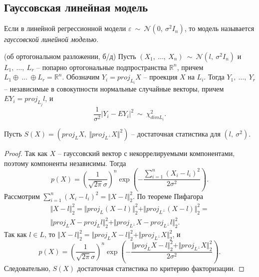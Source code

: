 \subsection{Гауссовская линейная модель}
\begin{definition}
    Если в линейной регрессионной модели $\displaystyle \varepsilon \ \sim \ \mathcal{N}\left( 0,\ \sigma ^{2} I_{n}\right)$, то модель называется \textit{гауссовской линейной моделью}.
\end{definition}
\begin{theorem}
    (об ортогональном разложении, б/д) Пусть $\displaystyle ( X_{1} ,\ \dotsc ,\ X_{n}) \ \sim \ \mathcal{N}\left( l,\ \sigma ^{2} I_{n}\right)$ и $\displaystyle L_{1} ,\ \dotsc ,\ L_{r}$ -- попарно ортогональные подпространства $\displaystyle \mathbb{R}^{n}$, причем $\displaystyle L_{1} \oplus \ \dotsc \ \oplus L_{r} =\mathbb{R}^{n}$. Обозначим $\displaystyle Y_{i} =proj_{L_{i}} X$ -- проекция $\displaystyle X$ на $\displaystyle L_{i}$. Тогда $\displaystyle Y_{1} ,\ \dotsc ,\ Y_{r}$ -- независимые в совокупности нормальные случайные векторы, причем $\displaystyle EY_{i} =proj_{L_{j}} l$, и
    \begin{equation*}
        \dfrac{1}{\sigma ^{2}}| Y_{i} -EY_{i}| ^{2} \ \sim \ \chi _{dimL_{i}}^{2} .
    \end{equation*}
\end{theorem}
\begin{proposition}
    Пусть $\displaystyle S( X) =\left( proj_{L} X,\ \Vert proj_{L^{\perp }} X\Vert ^{2}\right)$ -- достаточная статистика для $\displaystyle \left( l,\ \sigma ^{2}\right)$.
\end{proposition}
\begin{proof}
    Так как $\displaystyle X$ -- гауссовский вектор с некоррелируемыми компонентами, поэтому компоненты независимы. Тогда
    \begin{equation*}
        p( X) =\left(\dfrac{1}{\sqrt{2\pi } \sigma }\right)^{n}\exp\left( -\dfrac{\sum _{i=1}^{n}( X_{i} -l_{i})^{2}}{2\sigma ^{2}}\right) .
    \end{equation*}
    Рассмотрим $\displaystyle \sum _{i=1}^{n}( X_{i} -l_{i})^{2} =\Vert X-l\Vert _{2}^{2}$. По теореме Пифагора
    \begin{gather*}
        \Vert X-l\Vert _{2}^{2} =\Vert proj_{L}( X-l)\Vert _{2}^{2} +\Vert proj_{L^{\perp }}( X-l)\Vert _{2}^{2} =\\
        \Vert proj_{L} X-proj_{L} l\Vert _{2}^{2} +\Vert proj_{L^{\perp }} X-proj_{L^{\perp }} l\Vert _{2}^{2} .
    \end{gather*}
    Так как $\displaystyle l\in L$, то $\displaystyle \Vert X-l\Vert _{2}^{2} =\Vert proj_{L} X-l\Vert _{2}^{2} +\Vert proj_{L^{\perp }} X\Vert _{2}^{2}$, и
    \begin{equation*}
        p( X) =\left(\dfrac{1}{\sqrt{2\pi } \sigma }\right)^{n}\exp\left( -\dfrac{\Vert proj_{L} X-l\Vert _{2}^{2} +\Vert proj_{L^{\perp }} X\Vert _{2}^{2}}{2\sigma ^{2}}\right) .
    \end{equation*}
    Следовательно, $\displaystyle S( X)$ достаточная статистика по критерию факторизации.
\end{proof}

